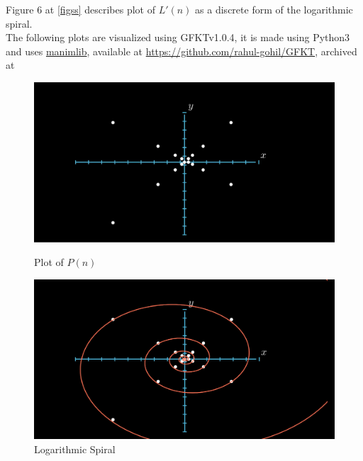 \documentclass[preprint,12pt]{elsarticle}
\begin{document}
	Figure 6 at \ref{figss} describes plot of $L'(n)$ as a discrete form of the logarithmic spiral.\\
	The following plots are visualized using GFKTv1.0.4\cite{rahulgohil_2020}, it is made using Python3 and uses \href{https://github.com/3b1b/manim}{manimlib}, available at \href{https://github.com/rahul-gohil/GFKT}{https://github.com/rahul-gohil/GFKT}, archived at 
	\begin{figure}[t]
		\centering
		\begin{minipage}{0.45\textwidth}
			\centering
			\includegraphics[scale=0.23, trim={3cm 0 6cm 0}, clip]{images/GFKT3.png}
			\caption{Plot of $P(n)$}
		\end{minipage}\hfill
		\begin{minipage}{0.45\textwidth}
			\centering
			\includegraphics[scale=0.23, trim={3cm 0 6cm 0}, clip]{images/GFKT4.png}
			\caption{Logarithmic Spiral}
		\end{minipage}
	\end{figure}
\end{document}
